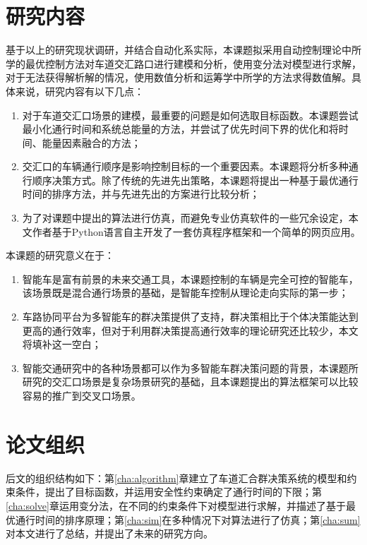 \section{研究内容}
基于以上的研究现状调研，并结合自动化系实际，本课题拟采用自动控制理论中所学的最优控制方法对车道交汇路口进行建模和分析，使用变分法对模型进行求解，对于无法获得解析解的情况，使用数值分析和运筹学中所学的方法求得数值解。具体来说，研究内容有以下几点：
\begin{enumerate}[label=(\arabic*),wide=\parindent]
\item 对于车道交汇口场景的建模，最重要的问题是如何选取目标函数。本课题尝试最小化通行时间和系统总能量的方法，并尝试了优先时间下界的优化和将时间、能量因素融合的方法；
\item 交汇口的车辆通行顺序是影响控制目标的一个重要因素。本课题将分析多种通行顺序决策方式。除了传统的先进先出策略，本课题将提出一种基于最优通行时间的排序方法，并与先进先出的方案进行比较分析；
\item 为了对课题中提出的算法进行仿真，而避免专业仿真软件的一些冗余设定，本文作者基于{\ttfamily Python}语言自主开发了一套仿真程序框架和一个简单的网页应用。
\end{enumerate}

本课题的研究意义在于：
\begin{enumerate}[label=(\arabic*),wide=\parindent]
\item 智能车是富有前景的未来交通工具，本课题控制的车辆是完全可控的智能车，该场景既是混合通行场景的基础，是智能车控制从理论走向实际的第一步；
\item 车路协同平台为多智能车的群决策提供了支持，群决策相比于个体决策能达到更高的通行效率，但对于利用群决策提高通行效率的理论研究还比较少，本文将填补这一空白；
\item 智能交通研究中的各种场景都可以作为多智能车群决策问题的背景，本课题所研究的交汇口场景是复杂场景研究的基础，且本课题提出的算法框架可以比较容易的推广到交叉口场景。
\end{enumerate}

\section{论文组织}
后文的组织结构如下：第\ref{cha:algorithm}章建立了车道汇合群决策系统的模型和约束条件，提出了目标函数，并运用安全性约束确定了通行时间的下限；第\ref{cha:solve}章运用变分法，在不同的约束条件下对模型进行求解，并描述了基于最优通行时间的排序原理；第\ref{cha:sim}在多种情况下对算法进行了仿真；第\ref{cha:sum}对本文进行了总结，并提出了未来的研究方向。